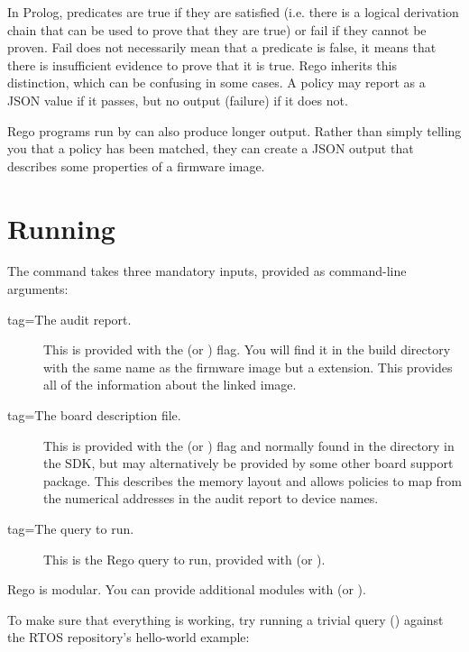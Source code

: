 \begin{note}
	In Prolog, predicates are true if they are satisfied (i.e. there is a logical derivation chain that can be used to prove that they are true) or fail if they cannot be proven.
	Fail does not necessarily mean that a predicate is false, it means that there is insufficient evidence to prove that it is true.
	Rego inherits this distinction, which can be confusing in some cases.
	A policy may report  as a JSON value if it passes, but no output (failure) if it does not.
\end{note}

Rego programs run by  can also produce longer output.
Rather than simply telling you that a policy has been matched, they can create a JSON output that describes some properties of a firmware image.

\section{Running }

The  command takes three mandatory inputs, provided as command-line arguments:

\begin{description}
	\item[tag=The audit report.]{ This is provided with the  (or ) flag.
		You will find it in the build directory with the same name as the firmware image but a  extension.
		This provides all of the information about the linked image.}
	\item[tag=The board description file.]{ This is provided with the  (or ) flag and normally found in the  directory in the SDK, but may alternatively be provided by some other board support package.
		This describes the memory layout and allows policies to map from the numerical addresses in the audit report to device names.}
	\item[tag=The query to run.]{ This is the Rego query to run, provided with  (or ).}
\end{description}

Rego is modular.
You can provide additional modules with  (or ).

To make sure that everything is working, try running a trivial query () against the RTOS repository's hello-world example:

